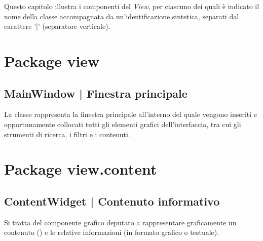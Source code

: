 \documentclass[10pt,a4paper,headinclude,footinclude,hidelinks]{scrreprt} %
\begin{document}
	Questo capitolo illustra i componenti del \textit{View}, per ciascuno dei quali è indicato il nome della classe accompagnata da un'identificazione sintetica, separati dal carattere '|' (separatore verticale).

	\section{Package view}
	\label{sec:stage:design:sistema:view}
	
	\subsection[MainWindow]{MainWindow | Finestra principale}
	\label{sec:stage:design:sistema:view:window}
	La classe \textit{} rappresenta la finestra principale all'interno del quale vengono inseriti e opportunamente collocati tutti gli elementi grafici dell'interfaccia, tra cui gli strumenti di ricerca, i filtri e i contenuti.

	\section{Package view.content}
	\label{sec:stage:design:sistema:view.content}

	\subsection[ContentWidget]{ContentWidget | Contenuto informativo}
	\label{sec:stage:design:sistema:view:content-widget}
	Si tratta del componente grafico deputato a rappresentare graficamente un contenuto (\textit{}) e le relative informazioni (in formato grafico o testuale).
\end{document}
